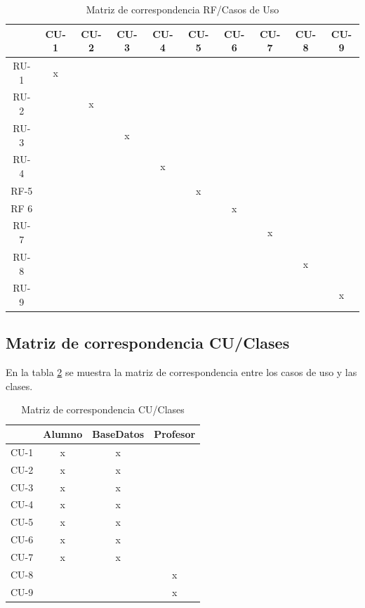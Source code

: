\begin{table}[h!]
	\centering
	\begin{tabular}{cccccccccc}
		\toprule
		& CU-1 & CU-2 & CU-3 & CU-4 & CU-5 & CU-6 & CU-7 & CU-8 & CU-9  \\
		\midrule
		RU-1 &  x&&&&&&&&   \\
		RU-2 &  &x&&&&&&&\\
		RU-3 &  &&x&&&&&&\\
		RU-4 &  &&&x&&&&&\\
		RF-5 &  &&&&x&&&&\\
		RF 6 &  &&&&&x&&&\\
		RU-7 &  &&&&&&x&&\\
		RU-8 &  &&&&&&&x&\\
		RU-9 &  &&&&&&&&x\\
		\bottomrule
	\end{tabular}
	\caption{\label{tab:correspondencia_rf_cu}Matriz de correspondencia RF/Casos de Uso}
\end{table}

\subsection{Matriz de correspondencia CU/Clases}
En la tabla \ref{tab:correspondencia_cu_clases} se muestra la matriz de correspondencia entre los casos de uso y las clases.
\begin{table}[h!]
	\centering
	\begin{tabular}{cccc}
		\toprule
			   & Alumno & BaseDatos & Profesor \\
		\midrule
		CU-1   & x       & x        &       \\
		CU-2   & x       & x        &       \\ 
		CU-3   & x       & x        &       \\
		CU-4   & x       & x        &       \\
		CU-5   & x       & x        &       \\
		CU-6   & x       & x        &       \\
		CU-7   & x       & x        &       \\ 
		CU-8   &         &          & x     \\
		CU-9   &         &          & x     \\
		\bottomrule
	\end{tabular}
	\caption{\label{tab:correspondencia_cu_clases}Matriz de correspondencia CU/Clases}
\end{table}